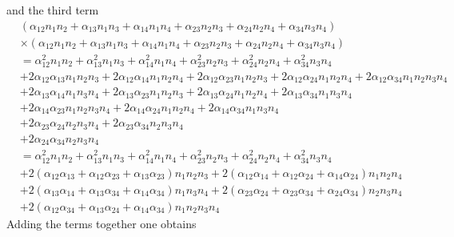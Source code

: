 \documentclass[aps,preprint]{revtex4}%
\begin{document}
and the third term%
\begin{align}
&  \left(  \alpha_{12}n_{1}n_{2}+\alpha_{13}n_{1}n_{3}+\alpha_{14}n_{1}%
n_{4}+\alpha_{23}n_{2}n_{3}+\alpha_{24}n_{2}n_{4}+\alpha_{34}n_{3}n_{4}\right)
\nonumber\\
&  \times\left(  \alpha_{12}n_{1}n_{2}+\alpha_{13}n_{1}n_{3}+\alpha_{14}%
n_{1}n_{4}+\alpha_{23}n_{2}n_{3}+\alpha_{24}n_{2}n_{4}+\alpha_{34}n_{3}%
n_{4}\right) \nonumber\\
&  =\alpha_{12}^{2}n_{1}n_{2}+\alpha_{13}^{2}n_{1}n_{3}+\alpha_{14}^{2}%
n_{1}n_{4}+\alpha_{23}^{2}n_{2}n_{3}+\alpha_{24}^{2}n_{2}n_{4}+\alpha_{34}%
^{2}n_{3}n_{4}\nonumber\\
&  +2\alpha_{12}\alpha_{13}n_{1}n_{2}n_{3}+2\alpha_{12}\alpha_{14}n_{1}%
n_{2}n_{4}+2\alpha_{12}\alpha_{23}n_{1}n_{2}n_{3}+2\alpha_{12}\alpha_{24}%
n_{1}n_{2}n_{4}+2\alpha_{12}\alpha_{34}n_{1}n_{2}n_{3}n_{4}\nonumber\\
&  +2\alpha_{13}\alpha_{14}n_{1}n_{3}n_{4}+2\alpha_{13}\alpha_{23}n_{1}%
n_{2}n_{3}+2\alpha_{13}\alpha_{24}n_{1}n_{2}n_{4}+2\alpha_{13}\alpha_{34}%
n_{1}n_{3}n_{4}\nonumber\\
&  +2\alpha_{14}\alpha_{23}n_{1}n_{2}n_{3}n_{4}+2\alpha_{14}\alpha_{24}%
n_{1}n_{2}n_{4}+2\alpha_{14}\alpha_{34}n_{1}n_{3}n_{4}\nonumber\\
&  +2\alpha_{23}\alpha_{24}n_{2}n_{3}n_{4}+2\alpha_{23}\alpha_{34}n_{2}%
n_{3}n_{4}\nonumber\\
&  +2\alpha_{24}\alpha_{34}n_{2}n_{3}n_{4}\nonumber\\
&  =\alpha_{12}^{2}n_{1}n_{2}+\alpha_{13}^{2}n_{1}n_{3}+\alpha_{14}^{2}%
n_{1}n_{4}+\alpha_{23}^{2}n_{2}n_{3}+\alpha_{24}^{2}n_{2}n_{4}+\alpha_{34}%
^{2}n_{3}n_{4}\nonumber\\
&  +2\left(  \alpha_{12}\alpha_{13}+\alpha_{12}\alpha_{23}+\alpha_{13}%
\alpha_{23}\right)  n_{1}n_{2}n_{3}+2\left(  \alpha_{12}\alpha_{14}%
+\alpha_{12}\alpha_{24}+\alpha_{14}\alpha_{24}\right)  n_{1}n_{2}%
n_{4}\nonumber\\
&  +2\left(  \alpha_{13}\alpha_{14}+\alpha_{13}\alpha_{34}+\alpha_{14}%
\alpha_{34}\right)  n_{1}n_{3}n_{4}+2\left(  \alpha_{23}\alpha_{24}%
+\alpha_{23}\alpha_{34}+\alpha_{24}\alpha_{34}\right)  n_{2}n_{3}%
n_{4}\nonumber\\
&  +2\left(  \alpha_{12}\alpha_{34}+\alpha_{13}\alpha_{24}+\alpha_{14}%
\alpha_{34}\right)  n_{1}n_{2}n_{3}n_{4}%
\end{align}
Adding the terms together one obtains
\end{document}
